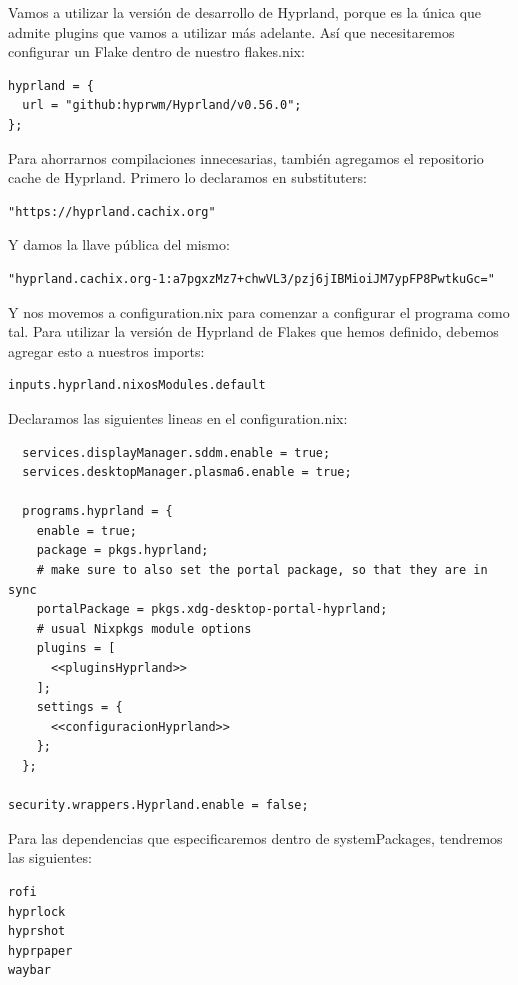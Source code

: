 \documentclass[11pt]{article}
\begin{document}
Vamos a utilizar la versión de desarrollo de Hyprland, porque es la única que admite plugins que vamos a utilizar más adelante. Así que necesitaremos configurar un Flake dentro de nuestro flakes.nix:

\begin{verbatim}
hyprland = {
  url = "github:hyprwm/Hyprland/v0.56.0";
};
\end{verbatim}

Para ahorrarnos compilaciones innecesarias, también agregamos el repositorio cache de Hyprland. Primero lo declaramos en substituters:

\begin{verbatim}
"https://hyprland.cachix.org"
\end{verbatim}

Y damos la llave pública del mismo:

\begin{verbatim}
"hyprland.cachix.org-1:a7pgxzMz7+chwVL3/pzj6jIBMioiJM7ypFP8PwtkuGc="
\end{verbatim}

Y nos movemos a configuration.nix para comenzar a configurar el programa como tal. Para utilizar la versión de Hyprland de Flakes que hemos definido, debemos agregar esto a nuestros imports:

\begin{verbatim}
inputs.hyprland.nixosModules.default
\end{verbatim}

Declaramos las siguientes lineas en el configuration.nix:

\begin{verbatim}
  services.displayManager.sddm.enable = true;
  services.desktopManager.plasma6.enable = true;

  programs.hyprland = {
    enable = true;
    package = pkgs.hyprland;
    # make sure to also set the portal package, so that they are in sync
    portalPackage = pkgs.xdg-desktop-portal-hyprland;
    # usual Nixpkgs module options
    plugins = [
      <<pluginsHyprland>>
    ];
    settings = {
      <<configuracionHyprland>>
    };
  };

security.wrappers.Hyprland.enable = false;
\end{verbatim}

Para las dependencias que especificaremos dentro de systemPackages, tendremos las siguientes:

\begin{verbatim}
rofi
hyprlock
hyprshot
hyprpaper
waybar
\end{verbatim}
\end{document}
